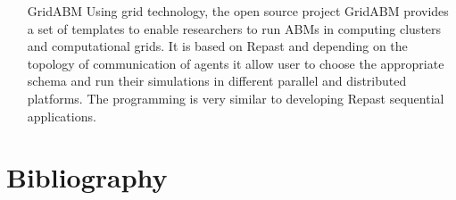 \documentclass[11pt,oneside,a4paper,openright]{report}
\begin{document}
\begin{enumerate}
\item[GridABM]
Using grid technology, the open source project GridABM \cite{SzemesDeBack2010} provides a
set of templates to enable researchers to run ABMs in computing clusters and computational grids. It is
based on Repast and depending on the topology of communication of agents it allow user to choose the
appropriate schema and run their simulations in different parallel and distributed platforms. The
programming is very similar to developing Repast sequential applications.

\end{enumerate}



\chapter{Bibliography}
\end{document}

